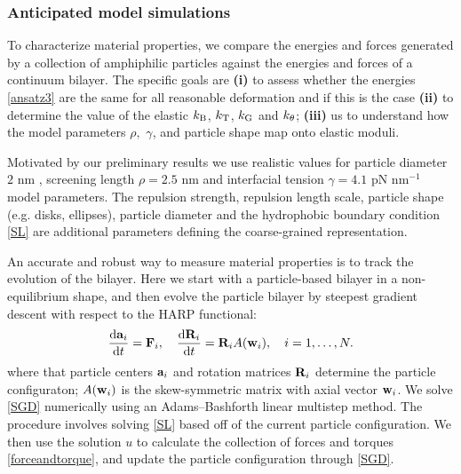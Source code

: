 \subsubsection{Anticipated model simulations}
To characterize material properties, we compare the energies and forces generated by
a collection of amphiphilic particles against the energies and forces of a continuum bilayer.
The specific goals are {\bf (i)} to assess whether the energies \eqref{ansatz3} are the same
for all reasonable deformation and if this is the case {\bf (ii)} to determine the value of the elastic $k_{\mathrm{B}}$,
$k_{\mathrm{T}}$, $k_{\mathrm{G}}$ and $k_{\theta}$; {\bf (iii)} us to understand how the model parameters $\rho,$ $\gamma$, and particle shape map onto elastic moduli. 

Motivated by our preliminary results \cite{Fu2018_SIAM}
we use realistic values for particle diameter $2$ nm \cite{Boal},
screening length $\rho = 2.5$ nm \cite{Eriksson1989,Lin2005,Parsegian,Israelachvili80,TerziDeserno17}
and interfacial tension $\gamma=4.1$ pN nm$^{-1}$ \cite{GarciaSaez, KUZMIN2005, Petelska2012, Jackson}
model parameters. The repulsion strength, repulsion length scale, particle shape (e.g. disks, ellipses), 
particle diameter and the hydrophobic boundary condition \eqref{SL}
are additional parameters defining the coarse-grained representation. 

An accurate and robust way to measure material properties is to track the evolution of the bilayer. 
Here we start with a particle-based bilayer in a non-equilibrium shape, and then evolve the particle bilayer by steepest gradient descent with respect to the
HARP functional:
\begin{equation}
\label{SGD}   
\frac{\dif {\bf a}_i}{\dif t} = {\bf F}_i,    \quad  \frac{\dif {\bf R}_i}{\dif t}  = {\bf R}_i A({\bf w}_i),\quad i = 1, \dots, N.
\end{equation}
where that particle centers ${\bf a}_i$ and rotation matrices ${\bf R}_i$ determine the particle configuraton; 
$A({\bf w}_i)$ is the skew-symmetric matrix with axial vector ${\bf w}_i$.
We solve \eqref{SGD} numerically 
using an Adams–Bashforth linear multistep method. The procedure involves solving \eqref{SL} based off of the current particle configuration.
We then use the solution $u$ to calculate the collection of forces and torques \eqref{forceandtorque}, and update the particle configuration
through \eqref{SGD}.

